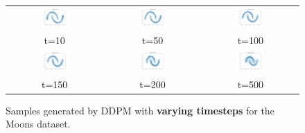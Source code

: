 \documentclass[11pt]{article}
\begin{document}
\begin{figure}[ht]
    \centering
    \begin{tabular}{ccc}
        \includegraphics[width=0.3\textwidth]{exps/ddpm_2_10_0.0001_0.02_moons/samples_10.png} &
        \includegraphics[width=0.3\textwidth]{exps/ddpm_2_50_0.0001_0.02_moons/samples_50.png} &
        \includegraphics[width=0.3\textwidth]{exps/ddpm_2_100_0.0001_0.02_moons/samples_100.png} \\
        t=10 & t=50 & t=100 \\[0.5em]
        
        \includegraphics[width=0.3\textwidth]{exps/ddpm_2_150_0.0001_0.02_moons/samples_150.png} &
        \includegraphics[width=0.3\textwidth]{exps/ddpm_2_200_0.0001_0.02_moons/samples_200.png} &
        \includegraphics[width=0.3\textwidth]{exps/ddpm_2_500_0.0001_0.02_moons/samples_500.png} \\
        t=150 & t=200 & t=500 \\
    \end{tabular}
    \caption{Samples generated by DDPM with \textbf{varying timesteps} for the Moons dataset.}
    \label{fig:timesteps_moons}
\end{figure}
\end{document}

